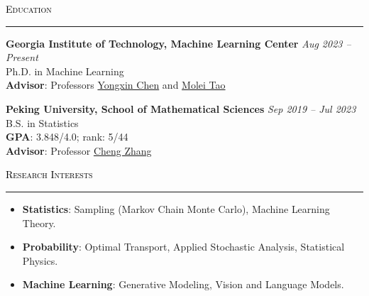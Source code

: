 \documentclass{resume} %
\renewenvironment{rSection}[1]{
\sectionskip
\textcolor{black}{\textsc{#1}}
\sectionlineskip
\hrule
\begin{list}{}{
\setlength{\leftmargin}{1.5em}
}
\item[]
}{
\end{list}
}
\begin{document}
\begin{rSection}{Education}
{\bf Georgia Institute of Technology, Machine Learning Center} \hfill {\em Aug 2023 -- Present} 
\\ Ph.D. in Machine Learning\hfill
\\ \textbf{Advisor}: Professors \href{https://yongxin.ae.gatech.edu/}{Yongxin Chen} and \href{https://mtao8.math.gatech.edu/index.html}{Molei Tao}

{\bf Peking University, School of Mathematical Sciences} \hfill {\em Sep 2019 -- Jul 2023} 
\\ B.S. in Statistics
\\ \textbf{GPA}: 3.848/4.0; rank: 5/44 \hfill
\\ \textbf{Advisor}: Professor \href{https://zcrabbit.github.io/}{Cheng Zhang} 
\end{rSection}

\begin{rSection}{Research Interests}
    \begin{itemize}[leftmargin=0in]
        \item \textbf{Statistics}: Sampling (Markov Chain Monte Carlo), Machine Learning Theory.
        \item \textbf{Probability}: Optimal Transport, Applied Stochastic Analysis, Statistical Physics.
        \item \textbf{Machine Learning}: Generative Modeling, Vision and Language Models.
    \end{itemize}
\end{rSection}




\end{document}
